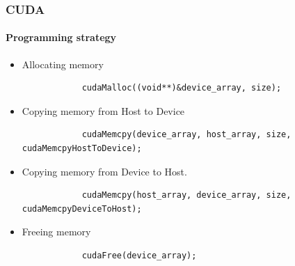 \begin{frame}[fragile]
    \frametitle{CUDA}
    \framesubtitle{Programming strategy}
    \begin{itemize}
        \item Allocating memory
        \begin{lstlisting}
            cudaMalloc((void**)&device_array, size);
        \end{lstlisting}
        \item Copying memory from Host to Device
        \begin{lstlisting}
            cudaMemcpy(device_array, host_array, size, cudaMemcpyHostToDevice);
        \end{lstlisting}
        \item Copying memory from Device to Host.
        \begin{lstlisting}
            cudaMemcpy(host_array, device_array, size, cudaMemcpyDeviceToHost);
        \end{lstlisting}
        \item Freeing memory
        \begin{lstlisting}
            cudaFree(device_array);
        \end{lstlisting}
    \end{itemize}
\end{frame}

